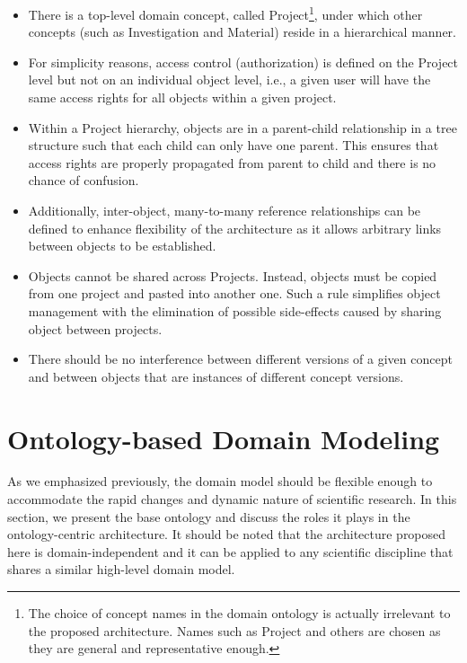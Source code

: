 \documentclass[conference,10pt]{IEEEtran}
\begin{document}
\begin{itemize}
\item There is a top-level domain concept, called Project\footnote{The choice of concept names in the domain ontology is actually irrelevant to the proposed architecture. Names such as Project and others are chosen as they are general and representative enough.}, under which other concepts (such as Investigation and Material) reside in a hierarchical manner.

\item For simplicity reasons, access control (authorization) is defined on the Project level but not on an individual object level, i.e., a given user will have the same access rights for all objects within a given project.
\item Within a Project hierarchy, objects are in a parent-child relationship in a tree structure such that each child can only have one parent. This ensures that access rights are properly propagated from parent to child and there is no chance of confusion.
\item Additionally, inter-object, many-to-many reference relationships can be defined to enhance flexibility of the architecture as it allows arbitrary links between objects to be established.
\item Objects cannot be shared across Projects. Instead, objects must be copied from one project and pasted into another one. Such a rule simplifies object management with the elimination of possible side-effects caused by sharing object between projects.

\item There should be no interference between different versions of a given concept and between objects that are instances of different concept versions.
\end{itemize}

\section{Ontology-based Domain Modeling}\label{sec:ont}
As we emphasized previously, the domain model should be flexible enough to accommodate the rapid changes and dynamic nature of scientific research. In this section, we present the base ontology and discuss the roles it plays in the ontology-centric architecture. It should be noted that the architecture proposed here is domain-independent and it can be applied to any scientific discipline that shares a similar high-level domain model.
\end{document}

